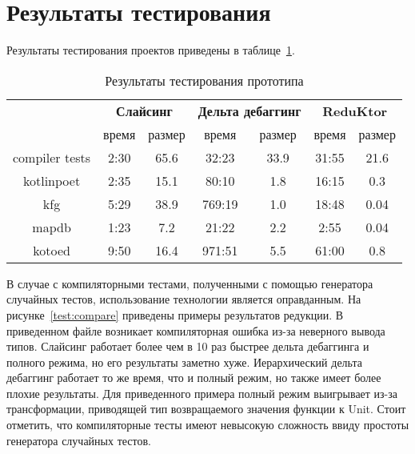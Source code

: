 \section{Результаты тестирования}
Результаты тестирования проектов приведены в таблице~\ref{tab:testing}.
\begin{table}[]
\center
\caption{\label{tab:testing}Результаты тестирования прототипа}
\begin{tabular}{| c | c | c | c | c | c | c |}
\hline
\bf \multirow{2}{*}{Проект} & \multicolumn{2}{|c|}{\bf Слайсинг} & \multicolumn{2}{|c|}{\bf Дельта дебаггинг}  & \multicolumn{2}{|c|}{\bf ReduKtor} \\
\cline{2-7}
& время & размер & время & размер & время & размер \\
\hline
compiler tests & 2:30 & 65.6 & 32:23 & 33.9 & 31:55 & 21.6 \\
\hline
kotlinpoet & 2:35 & 15.1 & 80:10 & 1.8 & 16:15 & 0.3 \\
\hline
kfg & 5:29 & 38.9 & 769:19 & 1.0 & 18:48 & 0.04 \\
\hline
mapdb & 1:23 & 7.2 & 21:22 & 2.2 & 2:55 & 0.04 \\
\hline
kotoed & 9:50 & 16.4 & 971:51 & 5.5 & 61:00 & 0.8 \\
\hline
\end{tabular}
\end{table}
В случае с компиляторными тестами, полученными с помощью генератора случайных тестов, использование технологии является оправданным. На рисунке~\ref{test:compare} приведены примеры результатов редукции. В приведенном файле возникает компиляторная ошибка из-за неверного вывода типов. Слайсинг работает более чем в 10 раз быстрее дельта дебаггинга и полного режима, но его результаты заметно хуже. Иерархический дельта дебаггинг работает то же время, что и полный режим, но также имеет более плохие результаты. Для приведенного примера полный режим выигрывает из-за трансформации, приводящей тип возвращаемого значения функции к Unit. Стоит отметить, что компиляторные тесты имеют невысокую сложность ввиду простоты генератора случайных тестов.
